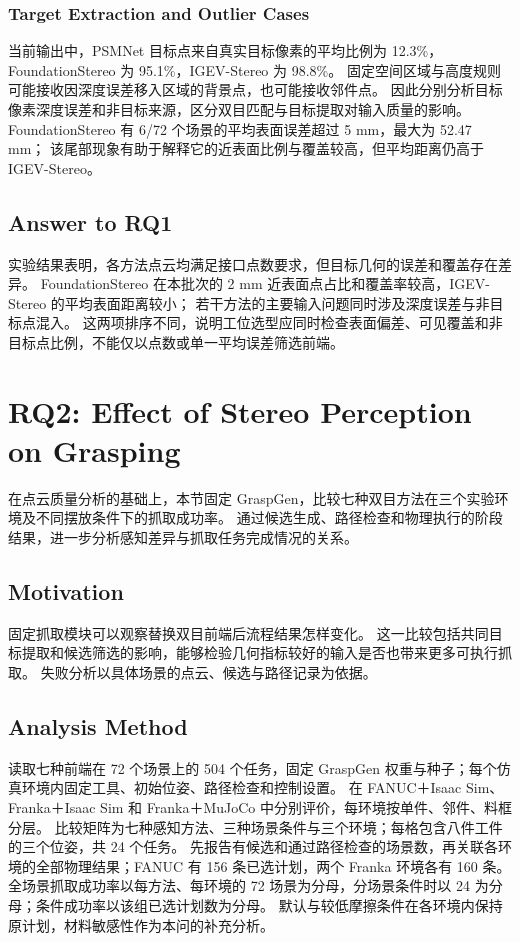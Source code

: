 \documentclass[UTF8,fontset=fandol,a4paper,11pt]{ctexart}
\newcommand{\qyb}[1]{#1}
\begin{document}
\subsubsection{Target Extraction and Outlier Cases}

当前输出中，PSMNet 目标点来自真实目标像素的平均比例为 12.3\%，FoundationStereo 为 95.1\%，IGEV-Stereo 为 98.8\%。
固定空间区域与高度规则可能接收因深度误差移入区域的背景点，也可能接收邻件点。
因此分别分析目标像素深度误差和非目标来源，区分双目匹配与目标提取对输入质量的影响。
FoundationStereo 有 6/72 个场景的平均表面误差超过 5 mm，最大为 52.47 mm；
该尾部现象有助于解释它的近表面比例与覆盖较高，但平均距离仍高于 IGEV-Stereo。

\subsection{\qyb{Answer to RQ1}}

实验结果表明，各方法点云均满足接口点数要求，但目标几何的误差和覆盖存在差异。
FoundationStereo 在本批次的 2 mm 近表面点占比和覆盖率较高，IGEV-Stereo 的平均表面距离较小；
若干方法的主要输入问题同时涉及深度误差与非目标点混入。
这两项排序不同，说明工位选型应同时检查表面偏差、可见覆盖和非目标点比例，不能仅以点数或单一平均误差筛选前端。

\section{\qyb{RQ2: Effect of Stereo Perception on Grasping}}
\label{sec:rq2}

在点云质量分析的基础上，本节固定 GraspGen，比较七种双目方法在三个实验环境及不同摆放条件下的抓取成功率。
通过候选生成、路径检查和物理执行的阶段结果，进一步分析感知差异与抓取任务完成情况的关系。

\subsection{\qyb{Motivation}}

固定抓取模块可以观察替换双目前端后流程结果怎样变化。
这一比较包括共同目标提取和候选筛选的影响，能够检验几何指标较好的输入是否也带来更多可执行抓取。
失败分析以具体场景的点云、候选与路径记录为依据。

\subsection{\qyb{Analysis Method}}

读取七种前端在 72 个场景上的 504 个任务，固定 GraspGen 权重与种子；每个仿真环境内固定工具、初始位姿、路径检查和控制设置。
在 FANUC＋Isaac Sim、Franka＋Isaac Sim 和 Franka＋MuJoCo 中分别评价，每环境按单件、邻件、料框分层。
比较矩阵为七种感知方法、三种场景条件与三个环境；每格包含八件工件的三个位姿，共 24 个任务。
先报告有候选和通过路径检查的场景数，再关联各环境的全部物理结果；FANUC 有 156 条已选计划，两个 Franka 环境各有 160 条。
全场景抓取成功率以每方法、每环境的 72 场景为分母，分场景条件时以 24 为分母；条件成功率以该组已选计划数为分母。
默认与较低摩擦条件在各环境内保持原计划，材料敏感性作为本问的补充分析。
\end{document}
